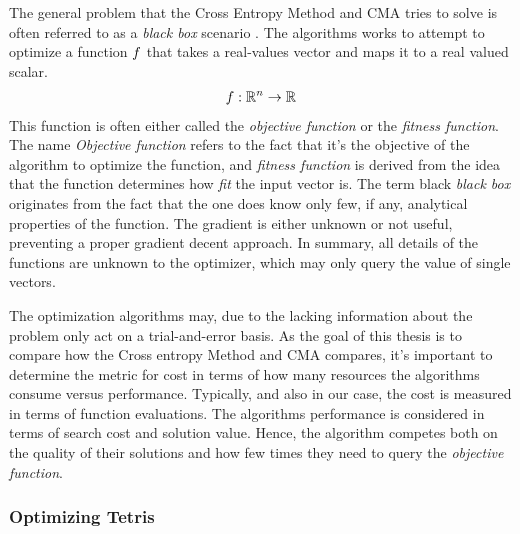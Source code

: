 The general problem that the Cross Entropy Method and CMA 
tries to solve is often referred  to as a \textit{black box}
scenario \citep{hansen2011}. The algorithms works to 
attempt to optimize a function $f$ that takes
a real-values vector and maps it to a real valued scalar.
\begin{align*}
f : \mathbb{R}^{n} \rightarrow \mathbb{R}
\end{align*}
This function is often either called the \textit{objective function}
or the \textit{fitness function}. The name \textit{Objective function}
refers to the fact that it's the objective of the algorithm to optimize
the function, and \textit{fitness function} is derived from the
idea that the function determines how \textit{fit} the input vector
is. The term black \textit{black box} originates from the fact that 
the one does know only few, if any, analytical properties of the function.
The gradient is either unknown or not useful, preventing a 
proper gradient 
decent approach. In summary, all details of the functions are unknown to 
the optimizer, which may only query the value of single vectors.
\begin{figure}[H]
\centering
{}
\end{figure}
The optimization algorithms may, due to the lacking information about the
problem only act on a trial-and-error basis. As the goal of this
thesis is to compare how the Cross entropy Method and CMA compares, 
it's important to determine the metric for cost in terms of 
how many resources the algorithms consume versus performance.
Typically, and also in our case, the cost is measured in terms 
of function evaluations. The algorithms performance is considered 
in terms of search cost and solution value. Hence, the algorithm 
competes both on the quality of their solutions and how few times
they need to query the \textit{objective function}.


\subsubsection{Optimizing Tetris}


